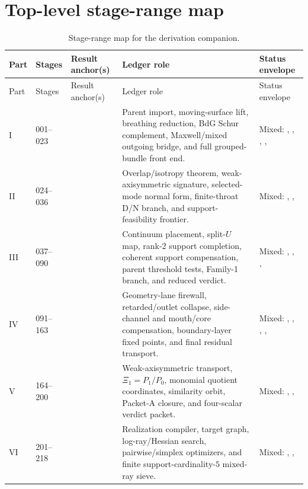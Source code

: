 \section{Top-level stage-range map}
\label{sec:stage-ledger-range-map}

{\setlength{\tabcolsep}{3pt}
\begin{longtable}{@{}L{0.08\textwidth}L{0.14\textwidth}L{0.17\textwidth}L{0.35\textwidth}L{0.20\textwidth}@{}}
\caption{Stage-range map for the derivation companion.}\label{tab:stage-ledger-range-map}\\
\toprule
Part & Stages & Result anchor(s) & Ledger role & Status envelope \\
\midrule
\endfirsthead
\toprule
Part & Stages & Result anchor(s) & Ledger role & Status envelope \\
\midrule
\endhead
I & 001--023 &  & Parent import, moving-surface lift, breathing reduction, BdG Schur complement, Maxwell/mixed outgoing bridge, and full grouped-bundle front end. & Mixed: \StatusExact{}, \StatusEffective{}, \StatusReduced{}, \StatusExactClosure{}, \StatusOpen{} \\
\addlinespace
II & 024--036 &  & Overlap/isotropy theorem, weak-axisymmetric signature, selected-mode normal form, finite-throat D/N branch, and support-feasibility frontier. & Mixed: \StatusExactClosure{}, \StatusReduced{}, \StatusOpen{} \\
\addlinespace
III & 037--090 &  & Continuum placement, split-\(U\) map, rank-2 support completion, coherent support compensation, parent threshold tests, Family-1 branch, and reduced verdict. & Mixed: \StatusExactClosure{}, \StatusReduced{}, \StatusEffective{}, \StatusOpen{} \\
\addlinespace
IV & 091--163 &  & Geometry-lane firewall, retarded/outlet collapse, side-channel and mouth/core compensation, boundary-layer fixed points, and final residual transport. & Mixed: \StatusExactClosure{}, \StatusReduced{}, \StatusEffective{}, \StatusNumerical{}, \StatusOpen{} \\
\addlinespace
V & 164--200 &  & Weak-axisymmetric transport, \(\Xi_1=P_1/P_0\), monomial quotient coordinates, similarity orbit, Packet-A closure, and four-scalar verdict packet. & Mixed: \StatusExactClosure{}, \StatusReduced{}, \StatusOpen{} \\
\addlinespace
VI & 201--218 &  & Realization compiler, target graph, log-ray/Hessian search, pairwise/simplex optimizers, and finite support-cardinality-\(5\) mixed-ray sieve. & Mixed: \StatusExactClosure{}, \StatusNumerical{}, \StatusOpen{} \\

\end{longtable}}
